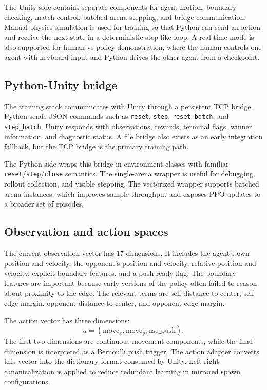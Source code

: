\documentclass{article}
\begin{document}
The Unity side contains separate components for agent motion, boundary checking, match control, batched arena stepping, and bridge communication. Manual physics simulation is used for training so that Python can send an action and receive the next state in a deterministic step-like loop. A real-time mode is also supported for human-vs-policy demonstration, where the human controls one agent with keyboard input and Python drives the other agent from a checkpoint.

\subsection{Python-Unity bridge}

The training stack communicates with Unity through a persistent TCP bridge. Python sends JSON commands such as \texttt{reset}, \texttt{step}, \texttt{reset\_batch}, and \texttt{step\_batch}. Unity responds with observations, rewards, terminal flags, winner information, and diagnostic status. A file bridge also exists as an early integration fallback, but the TCP bridge is the primary training path.

The Python side wraps this bridge in environment classes with familiar \texttt{reset}/\texttt{step}/\texttt{close} semantics. The single-arena wrapper is useful for debugging, rollout collection, and visible stepping. The vectorized wrapper supports batched arena instances, which improves sample throughput and exposes PPO updates to a broader set of episodes.

\subsection{Observation and action spaces}

The current observation vector has 17 dimensions. It includes the agent's own position and velocity, the opponent's position and velocity, relative position and velocity, explicit boundary features, and a push-ready flag. The boundary features are important because early versions of the policy often failed to reason about proximity to the edge. The relevant terms are self distance to center, self edge margin, opponent distance to center, and opponent edge margin.

The action vector has three dimensions:
\[
    a = (\text{move}_x, \text{move}_y, \text{use\_push}).
\]
The first two dimensions are continuous movement components, while the final dimension is interpreted as a Bernoulli push trigger. The action adapter converts this vector into the dictionary format consumed by Unity. Left-right canonicalization is applied to reduce redundant learning in mirrored spawn configurations.
\end{document}
